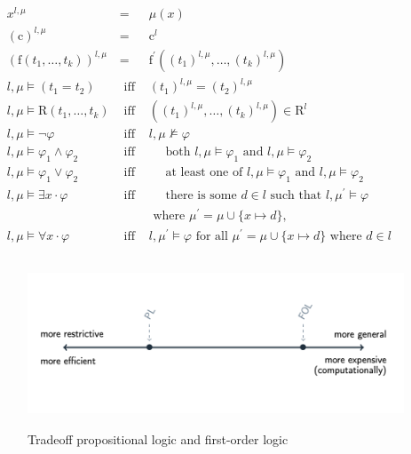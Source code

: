 \begin{itemize}
\begin{itemize}
        $\begin{aligned} &x^{l, \mu} &= \;\; &\mu(x) \\ &(\mathrm{c})^{l, \mu} &= \;\; &\mathrm{c}^{l} \\
        &\left(\mathrm{f}\left(t_{1}, \ldots, t_{k}\right)\right)^{l, \mu} &= \;\; &\mathrm{f}^{\prime}\left(\left(t_{1}\right)^{l, \mu}, \ldots,\left(t_{k}\right)^{l, \mu}\right) \\
        &l, \mu \models\left(t_{1}=t_{2}\right) & \text { iff } &\left(t_{1}\right)^{l, \mu}=\left(t_{2}\right)^{l, \mu} \\
        &l, \mu \models \mathrm{R}\left(t_{1}, \ldots, t_{k}\right) & \text { iff } &\left(\left(t_{1}\right)^{l, \mu}, \ldots,\left(t_{k}\right)^{l, \mu}\right) \in \mathrm{R}^{l} \\
        &l, \mu \models \neg \varphi & \text { iff } &l, \mu \not \models \varphi \\
        &l, \mu \models \varphi_{1} \wedge \varphi_{2} & \text { iff } &\quad \text { both } l, \mu \models \varphi_{1} \text { and } l, \mu \models \varphi_{2} \\
        &l, \mu \models \varphi_{1} \vee \varphi_{2} & \text { iff } &\quad \text { at least one of } l, \mu \models \varphi_{1} \text { and } l, \mu \models \varphi_{2} \\
        &l, \mu \models \exists x \cdot \varphi & \text { iff } &\quad \text { there is some } d \in l \text { such that } l, \mu^{\prime} \models \varphi \\
        & & & \text { where } \mu^{\prime}=\mu \cup\{x \mapsto d\}, \\
        &l, \mu \models \forall x \cdot \varphi & \text { iff } &l, \mu^{\prime} \models \varphi \text { for all } \mu^{\prime}=\mu \cup\{x \mapsto d\} \text { where } d \in l \end{aligned}$
    \end{itemize}

    \begin{figure}[ht!]
    	\centering
    	\includegraphics[height=5cm]{figures/tradeoff2.png}
    	Tradeoff propositional logic and first-order logic
    	\label{fig:tradeoff2}
    \end{figure}
    

\end{itemize}
